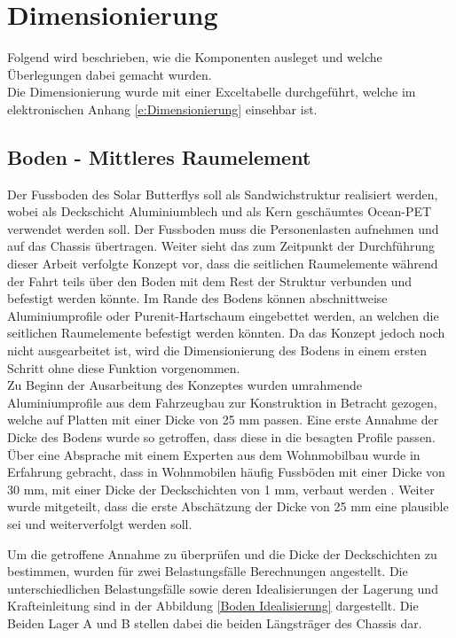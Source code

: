 \section{Dimensionierung}
Folgend wird beschrieben, wie die Komponenten ausleget und welche Überlegungen dabei gemacht wurden.\\
Die Dimensionierung wurde mit einer Exceltabelle durchgeführt, welche im elektronischen Anhang \ref{e:Dimensionierung} einsehbar ist.

\subsection{Boden - Mittleres Raumelement}
\label{Boden}
Der Fussboden des Solar Butterflys soll als Sandwichstruktur realisiert werden, wobei als Deckschicht Aluminiumblech und als Kern geschäumtes Ocean-PET verwendet werden soll. Der Fussboden muss die Personenlasten aufnehmen und auf das Chassis übertragen. Weiter sieht das zum Zeitpunkt der Durchführung dieser Arbeit verfolgte Konzept vor, dass die seitlichen Raumelemente während der Fahrt teils über den Boden mit dem Rest der Struktur verbunden und befestigt werden könnte. Im Rande des Bodens können abschnittweise Aluminiumprofile oder Purenit-Hartschaum eingebettet werden, an welchen die seitlichen Raumelemente befestigt werden könnten. Da das Konzept jedoch noch nicht ausgearbeitet ist, wird die Dimensionierung des Bodens in einem ersten Schritt ohne diese Funktion vorgenommen.\\
Zu Beginn der Ausarbeitung des Konzeptes wurden umrahmende Aluminiumprofile aus dem Fahrzeugbau zur Konstruktion in Betracht gezogen, welche auf Platten mit einer Dicke von 25 mm passen. Eine erste Annahme der Dicke des Bodens wurde so getroffen, dass diese in die besagten Profile passen. Über eine Absprache mit einem Experten aus dem Wohnmobilbau wurde in Erfahrung gebracht, dass in Wohnmobilen häufig Fussböden mit einer Dicke von 30 mm, mit einer Dicke der Deckschichten von 1 mm, verbaut werden \cite{Hartmut}. Weiter wurde mitgeteilt, dass die erste Abschätzung der Dicke von 25 mm eine plausible sei und weiterverfolgt werden soll.

Um die getroffene Annahme zu überprüfen und die Dicke der Deckschichten zu bestimmen, wurden für zwei Belastungsfälle Berechnungen angestellt. Die unterschiedlichen Belastungsfälle sowie deren Idealisierungen der Lagerung und Krafteinleitung sind in der Abbildung \ref{Boden Idealisierung} dargestellt. Die Beiden Lager A und B stellen dabei die beiden Längsträger des Chassis dar.


